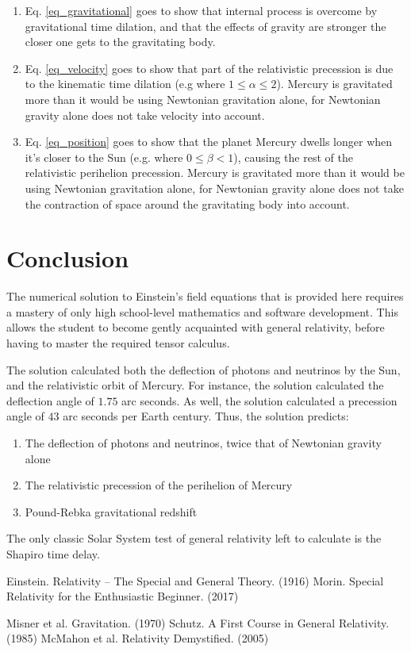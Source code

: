 \documentclass[12pt]{article}
\begin{document}
\begin{enumerate}
\item
Eq. \ref{eq_gravitational} goes to show that internal process is overcome by gravitational time dilation, and that the effects of gravity are stronger the closer one gets to the gravitating body.

\item
Eq. \ref{eq_velocity} goes to show that part of the relativistic precession is due to the kinematic time dilation (e.g where $1 \leq \alpha \leq 2$). 
Mercury is gravitated more than it would be using Newtonian gravitation alone, for Newtonian gravity alone does not take velocity into account.

\item
Eq. \ref{eq_position} goes to show that the planet Mercury dwells longer when it's closer to the Sun (e.g. where $0 \leq \beta < 1$), causing the rest of the relativistic perihelion precession. 
Mercury is gravitated more than it would be using Newtonian gravitation alone, for Newtonian gravity alone does not take the contraction of space around the gravitating body into account.

\end{enumerate}


\section{Conclusion}

The numerical solution to Einstein's field equations that is provided here requires a mastery of only high school-level mathematics and software development.
This allows the student to become gently acquainted with general relativity, before having to master the required tensor calculus.

The solution calculated both the deflection of photons and neutrinos by the Sun, and the relativistic orbit of Mercury.
For instance, the solution calculated the deflection angle of $1.75$ arc seconds.
As well, the solution calculated a precession angle of $43$ arc seconds per Earth century.
Thus, the solution predicts:
\begin{enumerate}
\item The deflection of photons and neutrinos, twice that of Newtonian gravity alone
\item The relativistic precession of the perihelion of Mercury
\item Pound-Rebka gravitational redshift
\end{enumerate}
The only classic Solar System test of general relativity left to calculate is the Shapiro time delay.






\begin{thebibliography}{9}


 Einstein. Relativity -- The Special and General Theory. (1916)
 Morin. Special Relativity for the Enthusiastic Beginner. (2017)

 Misner et al. Gravitation. (1970)
 Schutz. A First Course in General Relativity. (1985)
 McMahon et al. Relativity Demystified. (2005)

\end{thebibliography}
\end{document}
